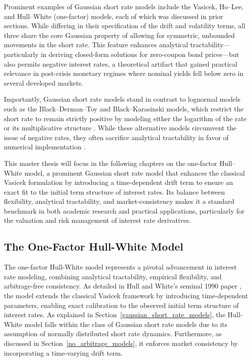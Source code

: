 Prominent examples of Gaussian short rate models include the Vasicek, Ho–Lee, and Hull–White (one-factor) models, each of which was discussed in prior sections. While differing in their specification of the drift and volatility terms, all three share the core Gaussian property of allowing for symmetric, unbounded movements in the short rate. This feature enhances analytical tractability—particularly in deriving closed-form solutions for zero-coupon bond prices—but also permits negative interest rates, a theoretical artifact that gained practical relevance in post-crisis monetary regimes where nominal yields fell below zero in several developed markets.

Importantly, Gaussian short rate models stand in contrast to lognormal models such as the Black–Derman–Toy and Black–Karasinski models, which restrict the short rate to remain strictly positive by modeling either the logarithm of the rate or its multiplicative structure . While these alternative models circumvent the issue of negative rates, they often sacrifice analytical tractability in favor of numerical implementation \parencite[p.~718]{hull2015optionsfutures}.

This master thesis will focus in the following chapters on the one-factor Hull–White model, a prominent Gaussian short rate model that enhances the classical Vasicek formulation by introducing a time-dependent drift term to ensure an exact fit to the initial term structure of interest rates. Its balance between flexibility, analytical tractability, and market-consistency makes it a standard benchmark in both academic research and practical applications, particularly for the valuation and risk management of interest rate derivatives.

\subsection{The One-Factor Hull-White Model}
The one-factor Hull-White model represents a pivotal advancement in interest rate modeling, combining analytical tractability, empirical flexibility, and arbitrage-free consistency. As detailed in Hull and White’s seminal 1990 paper \parencite{hull1990pricing}, the model extends the classical Vasicek framework by introducing time-dependent parameters, enabling exact calibration to the observed initial term structure of interest rates. As explained in Section~\ref{gaussian_short_rate_models}, the Hull-White model falls within the class of Gaussian short rate models due to its assumption of normally distributed short rate dynamics. Furthermore, as discussed in Section~\ref{no_arbitrage_models}, it enforces market consistency by incorporating a time-varying drift term.

